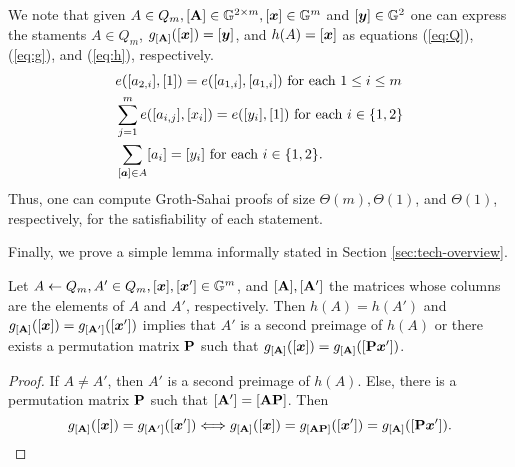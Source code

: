 We note that given $A\in Q_m,[\mathbf{{A}}]\in\mathbb{G}^{2\times m},[{\boldsymbol{x}}]\in\mathbb{G}^m$ and $[{\boldsymbol{y}}]\in\mathbb{G}^2$ one can express the staments $A\in Q_m$, $g_{[\mathbf{{A}}]}([{\boldsymbol{x}}])=[{\boldsymbol{y}}]$, and $h(A)=[{\boldsymbol{x}}]$ as equations (\ref{eq:Q}),(\ref{eq:g}), and (\ref{eq:h}), respectively.
 \begin{align}
&e([a_{2,i}],[1])=e([a_{1,i}],[a_{1,i}]) \text{ for each } 1\leq i\leq m \label{eq:Q}\\
&\sum_{j=1}^m e([a_{i,j}],[x_i]) = e([y_i],[1]) \text{ for each } i\in\{1,2\} \label{eq:g}\\
&\sum_{[{\boldsymbol{a}}]\in A} [a_i] = [y_i] \text{ for each } i\in\{1,2\}.\label{eq:h}
\end{align}
Thus, one can compute Groth-Sahai proofs of size $\Theta(m),\Theta(1)$, and $\Theta(1)$, respectively, for the satisfiability of each statement.

Finally, we prove a simple lemma informally stated in Section \ref{sec:tech-overview}.
\begin{lemma}\label{lemma:hg}
Let $A\gets Q_m,A'\in Q_m,[{\boldsymbol{x}}],[{\boldsymbol{x}}']\in\mathbb{G}^m$, and $[\mathbf{{A}}],[\mathbf{{A}}']$ the matrices whose columns are the elements of $A$ and $A'$, respectively. Then $h(A)=h(A')$ and $g_{[\mathbf{{A}}]}([{\boldsymbol{x}}])=g_{[\mathbf{{A}}']}([{\boldsymbol{x}}'])$ implies that $A'$ is a second preimage of $h(A)$ or there exists a permutation matrix $\mathbf{{P}}$ such that $g_{[\mathbf{{A}}]}([{\boldsymbol{x}}])=g_{[\mathbf{{A}}]}([\mathbf{{P}}{\boldsymbol{x}}'])$.
\end{lemma}
\begin{proof}
If $A\neq A'$, then $A'$ is a second preimage of $h(A)$. Else, there is a permutation matrix $\mathbf{{P}}$ such that $[\mathbf{{A}}'] =[\mathbf{{A}}\mathbf{{P}}]$. Then
$$
 g_{[\mathbf{{A}}]}([{\boldsymbol{x}}])=g_{[\mathbf{{A}}']}([{\boldsymbol{x}}'])\Longleftrightarrow  g_{[\mathbf{{A}}]}([{\boldsymbol{x}}])=g_{[\mathbf{{A}}\mathbf{{P}}]}([{\boldsymbol{x}}'])=g_{[\mathbf{{A}}]}([\mathbf{{P}}{\boldsymbol{x}}']).
$$
\end{proof}